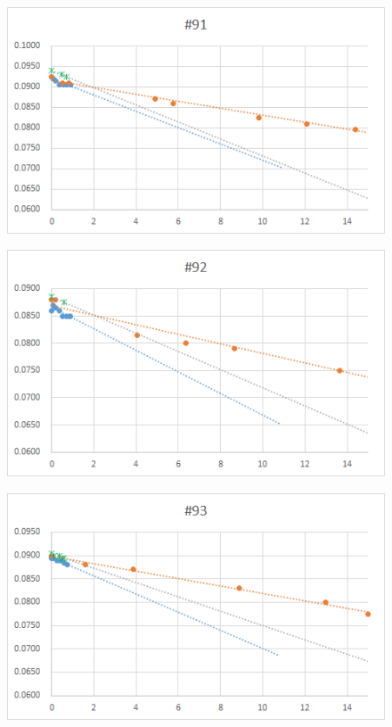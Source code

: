   \begin{figure}[htbp]
    \centering
       \includegraphics[width=120mm]{vol_091.png}
  \end{figure}
  \begin{figure}[htbp]
    \centering
       \includegraphics[width=120mm]{vol_092.png}
  \end{figure}
  \begin{figure}[htbp]
    \centering
       \includegraphics[width=120mm]{vol_093.png}
  \end{figure}
